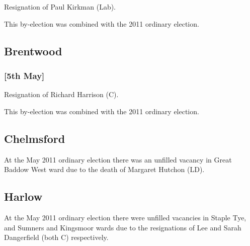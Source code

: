 \begin{resultsiii}

Resignation of Paul Kirkman (Lab).

This by-election was combined with the 2011 ordinary election.

\subsection*{Brentwood}

\subsubsection*{ \hspace*{\fill}\nolinebreak[1]%
\enspace\hspace*{\fill}
[5th May]}


Resignation of Richard Harrison (C).

This by-election was combined with the 2011 ordinary election.

\subsection*{Chelmsford}


At the May 2011 ordinary election there was an unfilled vacancy in Great Baddow West ward due to the death of Margaret Hutchon (LD).

\subsection*{Harlow}



At the May 2011 ordinary election there were unfilled vacancies in Staple Tye, and Sumners and Kingsmoor wards due to the resignations of Lee and Sarah Dangerfield (both C) respectively.


\end{resultsiii}
